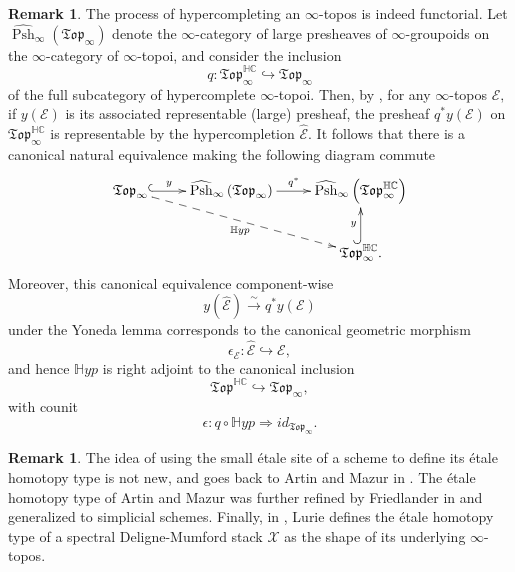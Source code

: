 \documentclass[12pt]{amsart}
\theoremstyle{definition}
\newtheorem{remark}[dummy]{Remark}
\newcommand{\cE}{\mathcal{E}}
\newcommand{\cX}{\mathcal{X}}
\renewcommand{\i}{\infty}
\def\LPshi{\widehat{\operatorname{Psh}}_\i}
\begin{document}
\begin{remark}\label{rmk:hypercompletion functor}
The process of hypercompleting an $\i$-topos is indeed functorial. Let $\LPshi\left(\mathfrak{Top}_\i\right)$ denote the $\i$-category of large presheaves of $\i$-groupoids on the $\i$-category of $\i$-topoi, and consider the inclusion $$q:\mathfrak{Top}^{\mathbb{HC}}_\i \hookrightarrow \mathfrak{Top}_\i$$ of the full subcategory of hypercomplete $\i$-topoi. Then, by \cite[Proposition 6.5.2.13]{htt}, for any $\i$-topos $\cE,$ if $y\left(\cE\right)$ is its associated representable (large) presheaf, the presheaf $q^*y\left(\cE\right)$ on $\mathfrak{Top}^{\mathbb{HC}}_\i$ is representable by the hypercompletion $\widehat{\cE}.$ It follows that there is a canonical natural equivalence making the following diagram commute
$$\xymatrix{\mathfrak{Top}_\i \ar@{-->}[rrd]_-{\mathbb{H}yp} \ar@{^{(}->}[r]^-{y} & \LPshi\left(\mathfrak{Top}_\i\right) \ar[r]^-{q^*} & \LPshi\left(\mathfrak{Top}^{\mathbb{HC}}_\i\right)\\
& & \mathfrak{Top}^{\mathbb{HC}}_\i. \ar@{^{(}->}[u]^-{y}}$$ Moreover, this canonical equivalence component-wise $$y\left(\widehat{\cE}\right) \stackrel{\sim}{\longrightarrow} q^*y\left(\cE\right)$$ under the Yoneda lemma corresponds to the canonical geometric morphism $$\epsilon_{\cE}:\widehat{\cE} \hookrightarrow \cE,$$ and hence $\mathbb{H}yp$ is right adjoint to the canonical inclusion $$\mathfrak{Top}^{\mathbb{HC}} \hookrightarrow \mathfrak{Top}_\i,$$ with counit $$\epsilon: q \circ \mathbb{H}yp \Rightarrow id_{\mathfrak{Top}_\i}.$$
\end{remark}

\begin{remark}
The idea of using the small \'etale site of a scheme to define its \'etale homotopy type is not new, and goes back to Artin and Mazur in \cite{ArtinMazur}. The \'etale homotopy type of Artin and Mazur was further refined by Friedlander in \cite{Friedlander} and generalized to simplicial schemes. Finally, in \cite[Section 3.6]{dagxiii}, Lurie defines the \'etale homotopy type of a spectral Deligne-Mumford stack $\cX$ as the shape of its underlying $\i$-topos.
\end{remark}
\end{document}

